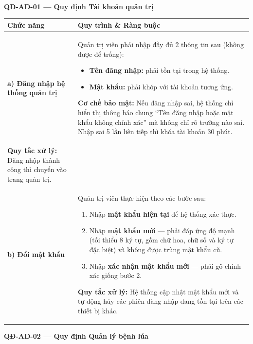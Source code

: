\documentclass[12pt,a4paper]{article}
\begin{document}
\vspace{0.3cm}
\noindent\textbf{QĐ-AD-01 --- Quy định Tài khoản quản trị}
 
\begin{longtable}{|
    >{\raggedright\arraybackslash}p{2.8cm}|
    >{\raggedright\arraybackslash}p{12cm}|}
\hline
\rowcolor{headerblue}
\textbf{Chức năng} & \textbf{Quy trình \& Ràng buộc} \\
\hline
\endhead
\textbf{a) Đăng nhập hệ thống quản trị} &
Quản trị viên phải nhập đầy đủ 2 thông tin sau (không được để trống):
\begin{itemize}[leftmargin=*,topsep=2pt,itemsep=1pt]
    \item \textbf{Tên đăng nhập:} phải tồn tại trong hệ thống.
    \item \textbf{Mật khẩu:} phải khớp với tài khoản tương ứng.
\end{itemize}
\textbf{Cơ chế bảo mật:} Nếu đăng nhập sai, hệ thống chỉ hiển thị thông báo chung ``Tên đăng nhập hoặc mật khẩu không chính xác'' mà không chỉ rõ trường nào sai. Nhập sai 5 lần liên tiếp thì khóa tài khoản 30 phút. \\
\textbf{Quy tắc xử lý:} Đăng nhập thành công thì chuyển vào trang quản trị. \\
\hline
\textbf{b) Đổi mật khẩu} &
Quản trị viên thực hiện theo các bước sau:
\begin{enumerate}[leftmargin=*,topsep=2pt,itemsep=1pt]
    \item Nhập \textbf{mật khẩu hiện tại} để hệ thống xác thực.
    \item Nhập \textbf{mật khẩu mới} --- phải đáp ứng độ mạnh (tối thiểu 8 ký tự, gồm chữ hoa, chữ số và ký tự đặc biệt) và không được trùng mật khẩu cũ.
    \item Nhập \textbf{xác nhận mật khẩu mới} --- phải gõ chính xác giống bước 2.
\end{enumerate}
\textbf{Quy tắc xử lý:} Hệ thống cập nhật mật khẩu mới và tự động hủy các phiên đăng nhập đang tồn tại trên các thiết bị khác. \\
\hline
\end{longtable}
 
\vspace{0.3cm}
\noindent\textbf{QĐ-AD-02 --- Quy định Quản lý bệnh lúa}
 
\end{document}
